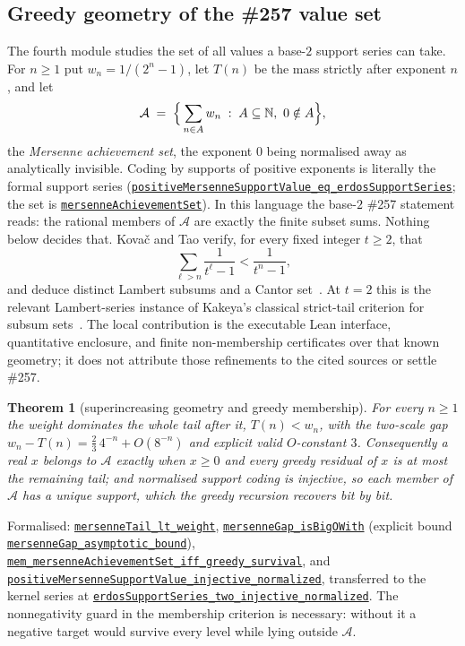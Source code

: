 \documentclass[11pt]{article}
\newcommand{\commit}{81150c1c6fdd4cd51e76d3aa0de344341e0e9e7c}
\newcommand{\repobase}{https://github.com/wcook04/plectis-lean-erdos249-257/blob/\commit}
\newcommand{\PK}{Erdos249257}
\newcommand{\lref}[3]{\href{\repobase/\PK/#1\#L#2}{\nolinkurl{#3}}}
\newcommand{\lrefx}[3]{\href{\repobase/\PK/#1\#L#2}{\nolinkurl{#3}}}
\newtheorem{theorem}{Theorem}[section]
\theoremstyle{definition}
\theoremstyle{remark}
\newcommand{\N}{\mathbb{N}}
\begin{document}
\subsection{Greedy geometry of the \#257 value set}

The fourth module studies the set of all values a base-$2$ support series can
take. For $n\ge1$ put $w_n=1/(2^n-1)$, let $T(n)$ be the mass strictly after
exponent $n$, and let
\[
\mathcal A\;=\;\Bigl\{\,\sum_{n\in A}w_n \;:\; A\subseteq\N,\ 0\notin A\Bigr\},
\]
the \emph{Mersenne achievement set}, the exponent $0$ being normalised away as
analytically invisible. Coding by supports of positive exponents is literally
the formal support series
(\lrefx{GreedyAchievementSet.lean}{554}{positiveMersenneSupportValue_eq_erdosSupportSeries};
the set is \lrefx{GreedyAchievementSet.lean}{571}{mersenneAchievementSet}). In
this language the base-$2$ \#257 statement reads: the rational members of
$\mathcal A$ are exactly the finite subset sums. Nothing below decides that.
Kova\v{c} and Tao verify, for every fixed integer $t\ge2$, that
\[
  \sum_{\ell>n}\frac1{t^\ell-1}<\frac1{t^n-1},
\]
and deduce distinct Lambert subsums and a Cantor set~\cite{kovactao}. At
$t=2$ this is the relevant Lambert-series instance of Kakeya's classical
strict-tail criterion for subsum sets~\cite{kakeya1914}. The local
contribution is the executable Lean interface, quantitative enclosure, and
finite non-membership certificates over that known geometry; it does not
attribute those refinements to the cited sources or settle \#257.

\begin{theorem}[superincreasing geometry and greedy membership]\label{res:greedy}
For every $n\ge1$ the weight dominates the whole tail after it, $T(n)<w_n$,
with the two-scale gap $w_n-T(n)=\tfrac23\,4^{-n}+O(8^{-n})$ and explicit
valid $O$-constant $3$. Consequently a real $x$ belongs to $\mathcal A$
exactly when $x\ge0$ and every greedy residual of $x$ is at most the remaining
tail; and normalised support coding is injective, so each member of
$\mathcal A$ has a unique support, which the greedy recursion recovers bit by
bit.
\end{theorem}
\noindent Formalised:
\lref{GreedyAchievementSet.lean}{180}{mersenneTail_lt_weight},
\lref{GreedyAchievementSet.lean}{473}{mersenneGap_isBigOWith} (explicit bound
\lrefx{GreedyAchievementSet.lean}{448}{mersenneGap_asymptotic_bound}),
\lref{GreedyAchievementSet.lean}{1445}{mem_mersenneAchievementSet_iff_greedy_survival},
and
\lref{GreedyAchievementSet.lean}{1527}{positiveMersenneSupportValue_injective_normalized},
transferred to the kernel series at
\lrefx{GreedyAchievementSet.lean}{1536}{erdosSupportSeries_two_injective_normalized}.
The nonnegativity guard in the membership criterion is necessary: without it a
negative target would survive every level while lying outside $\mathcal A$.
\end{document}
